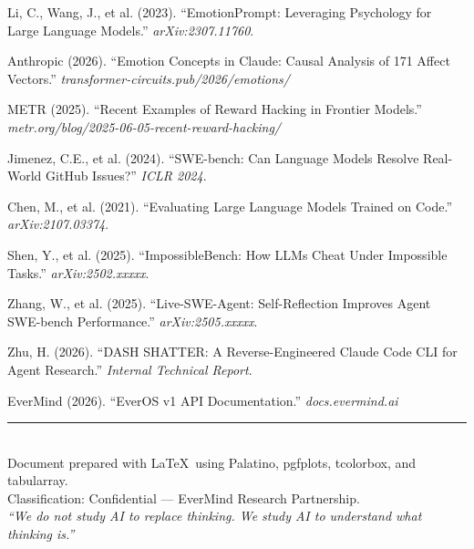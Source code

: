\documentclass[11pt, a4paper]{article}
\begin{document}
\begin{enumerate}[label={[\arabic*]}, leftmargin=2em, nosep, font=\small]
  \item Li, C., Wang, J., et al. (2023). ``EmotionPrompt: Leveraging Psychology for Large Language Models.'' \textit{arXiv:2307.11760}.
  \item Anthropic (2026). ``Emotion Concepts in Claude: Causal Analysis of 171 Affect Vectors.'' \textit{transformer-circuits.pub/2026/emotions/}
  \item METR (2025). ``Recent Examples of Reward Hacking in Frontier Models.'' \textit{metr.org/blog/2025-06-05-recent-reward-hacking/}
  \item Jimenez, C.E., et al. (2024). ``SWE-bench: Can Language Models Resolve Real-World GitHub Issues?'' \textit{ICLR 2024}.
  \item Chen, M., et al. (2021). ``Evaluating Large Language Models Trained on Code.'' \textit{arXiv:2107.03374}.
  \item Shen, Y., et al. (2025). ``ImpossibleBench: How LLMs Cheat Under Impossible Tasks.'' \textit{arXiv:2502.xxxxx}.
  \item Zhang, W., et al. (2025). ``Live-SWE-Agent: Self-Reflection Improves Agent SWE-bench Performance.'' \textit{arXiv:2505.xxxxx}.
  \item Zhu, H. (2026). ``DASH SHATTER: A Reverse-Engineered Claude Code CLI for Agent Research.'' \textit{Internal Technical Report}.
  \item EverMind (2026). ``EverOS v1 API Documentation.'' \textit{docs.evermind.ai}
\end{enumerate}

\vfill

\begin{center}
{\color{accent}\rule{0.5\textwidth}{0.5pt}}\\[8pt]
{\small\sffamily\color{faded} Document prepared with \LaTeX\ using Palatino, pgfplots, tcolorbox, and tabularray.\\
Classification: Confidential --- EverMind Research Partnership.\\[4pt]
\textit{``We do not study AI to replace thinking. We study AI to understand what thinking is.''}}
\end{center}
\end{document}
